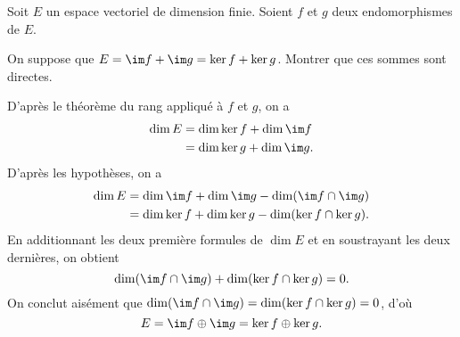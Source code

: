 \begin{enonce}
\begin{exercise}[ID={RMS113/4 E417 CCP},subtitle={},tags={}, difficulty={0}]
Soit $E$ un espace vectoriel de dimension finie.
Soient $f$ et $g$ deux endomorphismes de $E$.

On suppose que $E=\im f+\im g=\ker f+\ker g$.
Montrer que ces sommes sont directes.
\end{exercise}
\begin{solution}
D'après le théorème du rang appliqué à $f$ et $g$, on a
\begin{align*}
\dim E
&=\dim \ker f+\dim \im f\\
&=\dim \ker g+\dim \im g.
\end{align*}
D'après les hypothèses, on a
\begin{align*}
\dim E
&= \dim \im f+\dim \im g -\dim(\im f\cap\im g)\\
&= \dim \ker f+\dim \ker g -\dim(\ker f\cap\ker g).
\end{align*}
En additionnant les deux première formules de $\dim E$ et en soustrayant les deux dernières, on obtient
\begin{equation*}
    \dim (\im f\cap\im g)+\dim(\ker f\cap\ker g)=0.
\end{equation*}
On conclut aisément que $\dim (\im f\cap\im g)=\dim(\ker f\cap\ker g)=0$, d'où
\begin{equation*}
    E=\im f\oplus\im g=\ker f\oplus\ker g.
\end{equation*}
\end{solution}
\end{enonce}
